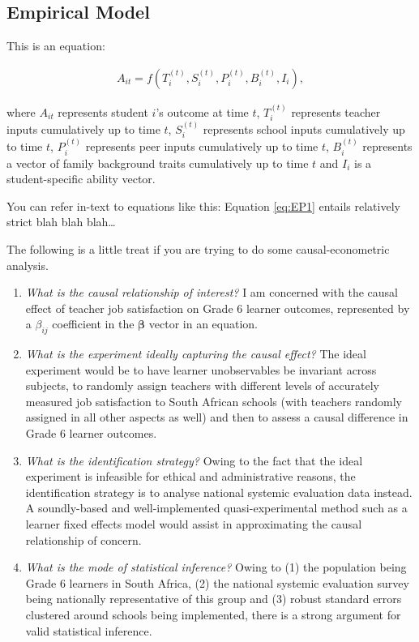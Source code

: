 \documentclass[12pt,preprint, authoryear]{article}
\numberwithin{equation}{section}
\numberwithin{figure}{section}
\numberwithin{table}{section}
\begin{document}
\subsection{\texorpdfstring{Empirical Model
\label{Model}}{Empirical Model }}\label{empirical-model}

This is an equation:

\begin{align} \label{eq:EP1}
A_{it}=f(T_i^{(t)},S_i^{(t)},P_i^{(t)},B_i^{(t)},I_i),
\end{align}

where \(A_{it}\) represents student \(i\)'s outcome at time \(t\),
\(T_i^{(t)}\) represents teacher inputs cumulatively up to time \(t\),
\(S_i^{(t)}\) represents school inputs cumulatively up to time \(t\),
\(P_i^{(t)}\) represents peer inputs cumulatively up to time \(t\),
\(B_i^{(t)}\) represents a vector of family background traits
cumulatively up to time \(t\) and \(I_i\) is a student-specific ability
vector.

You can refer in-text to equations like this: Equation \ref{eq:EP1}
entails relatively strict blah blah blah\ldots{}

The following is a little treat if you are trying to do some
causal-econometric analysis.

\begin{enumerate}
\def\labelenumi{\arabic{enumi}.}
\item
  \emph{What is the causal relationship of interest?} I am concerned
  with the causal effect of teacher job satisfaction on Grade 6 learner
  outcomes, represented by a \(\beta_{ij}\) coefficient in the
  \(\boldsymbol\beta\) vector in an equation.
\item
  \emph{What is the experiment ideally capturing the causal effect?} The
  ideal experiment would be to have learner unobservables be invariant
  across subjects, to randomly assign teachers with different levels of
  accurately measured job satisfaction to South African schools (with
  teachers randomly assigned in all other aspects as well) and then to
  assess a causal difference in Grade 6 learner outcomes.
\item
  \emph{What is the identification strategy?} Owing to the fact that the
  ideal experiment is infeasible for ethical and administrative reasons,
  the identification strategy is to analyse national systemic evaluation
  data instead. A soundly-based and well-implemented quasi-experimental
  method such as a learner fixed effects model would assist in
  approximating the causal relationship of concern.
\item
  \emph{What is the mode of statistical inference?} Owing to (1) the
  population being Grade 6 learners in South Africa, (2) the national
  systemic evaluation survey being nationally representative of this
  group and (3) robust standard errors clustered around schools being
  implemented, there is a strong argument for valid statistical
  inference.
\end{enumerate}
\end{document}
